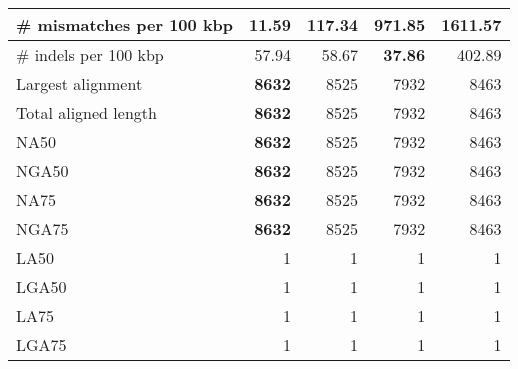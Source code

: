 \documentclass[12pt,a4paper]{article}
\begin{document}
\begin{table}[ht]
\begin{center}
\begin{tabular}{|l*{4}{|r}|}
\# mismatches per 100 kbp & {\bf 11.59} & 117.34 & 971.85 & 1611.57 \\ \hline
\# indels per 100 kbp & 57.94 & 58.67 & {\bf 37.86} & 402.89 \\ \hline
Largest alignment & {\bf 8632} & 8525 & 7932 & 8463 \\ \hline
Total aligned length & {\bf 8632} & 8525 & 7932 & 8463 \\ \hline
NA50 & {\bf 8632} & 8525 & 7932 & 8463 \\ \hline
NGA50 & {\bf 8632} & 8525 & 7932 & 8463 \\ \hline
NA75 & {\bf 8632} & 8525 & 7932 & 8463 \\ \hline
NGA75 & {\bf 8632} & 8525 & 7932 & 8463 \\ \hline
LA50 & 1 & 1 & 1 & 1 \\ \hline
LGA50 & 1 & 1 & 1 & 1 \\ \hline
LA75 & 1 & 1 & 1 & 1 \\ \hline
LGA75 & 1 & 1 & 1 & 1 \\ \hline
\end{tabular}
\end{center}
\end{table}
\end{document}
